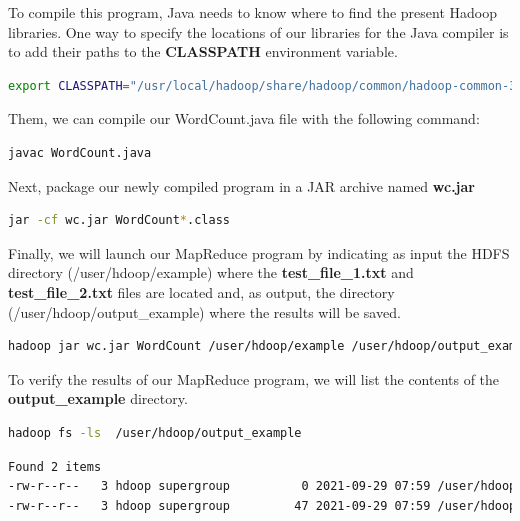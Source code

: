 \documentclass[12pt,english]{book}
\begin{document}
To compile this program, Java needs to know where to find the present Hadoop libraries.
One way to specify the locations of our libraries for the Java compiler is to add their paths to the \textbf{CLASSPATH} environment variable.

\begin{lstlisting}[language=bash, frame=single, basicstyle=\footnotesize, breaklines=true, postbreak=\mbox{\textcolor{red}{$\hookrightarrow$}\space}]
export CLASSPATH="/usr/local/hadoop/share/hadoop/common/hadoop-common-3.3.1.jar:/usr/local/hadoop/share/hadoop/mapreduce/hadoop-mapreduce-client-common-3.3.1.jar:/usr/local/hadoop/share/hadoop/common/lib/commons-cli-1.2.jar:/usr/local/hadoop/share/hadoop/mapreduce/hadoop-mapreduce-client-core-3.3.1.jar"
\end{lstlisting}

Them, we can compile our WordCount.java file with the following command:

\begin{lstlisting}[language=bash, frame=single, basicstyle=\footnotesize]
javac WordCount.java
\end{lstlisting}

Next, package our newly compiled program in a JAR archive named \textbf{wc.jar}

\begin{lstlisting}[language=bash, frame=single, basicstyle=\footnotesize]
jar -cf wc.jar WordCount*.class
\end{lstlisting}

Finally, we will launch our MapReduce program by indicating as input the HDFS directory (/user/hdoop/example) where the \textbf{test\_file\_1.txt} and \textbf{test\_file\_2.txt} files are located and, as output, the directory (/user/hdoop/output\_example)  where the results will be saved.

\begin{lstlisting}[language=bash, frame=single, basicstyle=\footnotesize]
hadoop jar wc.jar WordCount /user/hdoop/example /user/hdoop/output_example
\end{lstlisting}

To verify the results of our MapReduce program, we will list the contents of the \textbf{output\_example} directory.

\begin{lstlisting}[language=bash, frame=single, basicstyle=\footnotesize]
hadoop fs -ls  /user/hdoop/output_example
\end{lstlisting}
\begin{lstlisting}[language=bash, frame=single, basicstyle=\footnotesize]
Found 2 items
-rw-r--r--   3 hdoop supergroup          0 2021-09-29 07:59 /user/hdoop/output_example/_SUCCESS
-rw-r--r--   3 hdoop supergroup         47 2021-09-29 07:59 /user/hdoop/output_example/part-r-00000
\end{lstlisting}
\end{document}
